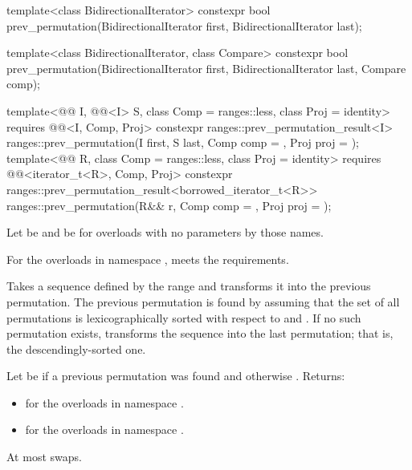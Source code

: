 %
\begin{itemdecl}
template<class BidirectionalIterator>
  constexpr bool prev_permutation(BidirectionalIterator first,
                                  BidirectionalIterator last);

template<class BidirectionalIterator, class Compare>
  constexpr bool prev_permutation(BidirectionalIterator first,
                                  BidirectionalIterator last, Compare comp);

template<@@ I, @@<I> S, class Comp = ranges::less,
         class Proj = identity>
  requires @@<I, Comp, Proj>
  constexpr ranges::prev_permutation_result<I>
    ranges::prev_permutation(I first, S last, Comp comp = {}, Proj proj = {});
template<@@ R, class Comp = ranges::less,
         class Proj = identity>
  requires @@<iterator_t<R>, Comp, Proj>
  constexpr ranges::prev_permutation_result<borrowed_iterator_t<R>>
    ranges::prev_permutation(R&& r, Comp comp = {}, Proj proj = {});
\end{itemdecl}

\begin{itemdescr}
\pnum
Let  be 
and  be 
for overloads with no parameters by those names.

\pnum
\expects
For the overloads in namespace ,
 meets
the  requirements.

\pnum
\effects
Takes a sequence defined by the range 
and transforms it into the previous permutation.
The previous permutation is found by assuming that the set of all permutations
is lexicographically sorted with respect to  and .
If no such permutation exists,
transforms the sequence into the last permutation;
that is, the descendingly-sorted one.

\pnum
\returns
Let  be  if a previous permutation was found and
otherwise .
Returns:
\begin{itemize}
\item {} for the overloads in namespace .
\item {} for the overloads in namespace .
\end{itemize}

\pnum
\complexity
At most  swaps.
\end{itemdescr}

